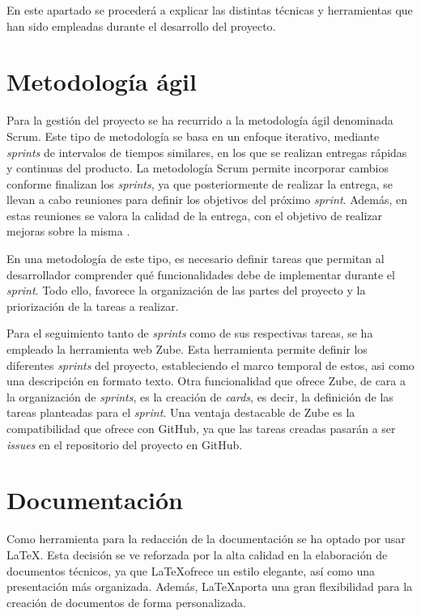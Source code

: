 
En este apartado se procederá a explicar las distintas técnicas y herramientas que han sido empleadas durante el desarrollo del proyecto.

\section{Metodología ágil}

Para la gestión del proyecto se ha recurrido a la metodología ágil denominada Scrum. Este tipo de metodología se basa en un enfoque iterativo, mediante \textit{sprints} de intervalos de tiempos similares, en los que se realizan entregas rápidas y continuas del producto. La metodología Scrum permite incorporar cambios conforme finalizan los \textit{sprints}, ya que posteriormente de realizar la entrega, se llevan a cabo reuniones para definir los objetivos del próximo \textit{sprint}. Además, en estas reuniones se valora la calidad de la entrega, con el objetivo de realizar mejoras sobre la misma \cite{scrum}.

En una metodología de este tipo, es necesario definir tareas que permitan al desarrollador comprender qué funcionalidades debe de implementar durante el \textit{sprint}. Todo ello, favorece la organización de las partes del proyecto y la priorización de la tareas a realizar.

Para el seguimiento tanto de \textit{sprints} como de sus respectivas tareas, se ha empleado la herramienta web Zube. Esta herramienta permite definir los diferentes \textit{sprints} del proyecto, estableciendo el marco temporal de estos, asi como una descripción en formato texto. Otra funcionalidad que ofrece Zube, de cara a la organización de \textit{sprints}, es la creación de \textit{cards}, es decir, la definición de las tareas planteadas para el \textit{sprint}. Una ventaja destacable de Zube es la compatibilidad que ofrece con GitHub, ya que las tareas creadas pasarán a ser \textit{issues} en el repositorio del proyecto en GitHub.

\section{Documentación}

Como herramienta para la redacción de la documentación se ha optado por usar \LaTeX. Esta decisión se ve reforzada por la alta calidad en la elaboración de documentos técnicos, ya que \LaTeX\space ofrece un estilo elegante, así como una presentación más organizada. Además, \LaTeX\space aporta una gran flexibilidad para la creación de documentos de forma personalizada.


